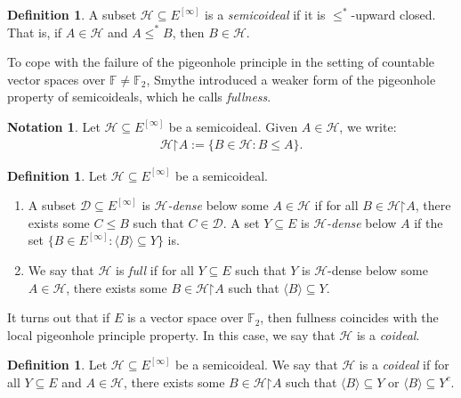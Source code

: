 \documentclass[11pt,reqno]{amsart}
\theoremstyle{plain}
\numberwithin{equation}{section}
\theoremstyle{definition}
\newtheorem{definition}[theorem]{Definition}
\newtheorem{notation}[theorem]{Notation}
\renewcommand{\c}[1]{\langle #1 \rangle}
\newcommand{\cal}{\mathcal}
\newcommand{\restrictedto}{\mathord{\upharpoonright}}
\renewcommand{\H}{\cal{H}}
\newcommand{\D}{\cal{D}}
\begin{document}
\begin{definition}
\label{def:semicoideal}
    A subset $\H \subseteq E^{[\infty]}$ is a \emph{semicoideal} if it is $\leq^*$-upward closed. That is, if $A \in \H$ and $A \leq^* B$, then $B \in \H$.
\end{definition}

To cope with the failure of the pigeonhole principle in the setting of countable vector spaces over $\mathbb{F} \neq \mathbb{F}_2$, Smythe introduced a weaker form of the pigeonhole property of semicoideals, which he calls \emph{fullness}.

\begin{notation}
    Let $\H \subseteq E^{[\infty]}$ be a semicoideal. Given $A \in \H$, we write:
    \begin{align*}
        \H\restrictedto A := \{B \in \H : B \leq A\}.
    \end{align*}
\end{notation}

\begin{definition}
\label{def:full.semicoideal}
    Let $\H \subseteq E^{[\infty]}$ be a semicoideal.
    \begin{enumerate}
        \item A subset $\D \subseteq E^{[\infty]}$ is \emph{$\H$-dense} below some $A \in \H$ if for all $B \in \H\restrictedto A$, there exists some $C \leq B$ such that $C \in \D$. A set $Y \subseteq E$ is \emph{$\H$-dense} below $A$ if the set $\{B \in E^{[\infty]} : \c{B} \subseteq Y\}$ is.

        \item We say that $\H$ is \emph{full} if for all $Y \subseteq E$ such that $Y$ is $\H$-dense below some $A \in \H$, there exists some $B \in \H\restrictedto A$ such that $\c{B} \subseteq Y$.
    \end{enumerate}
\end{definition}

It turns out that if $E$ is a vector space over $\mathbb{F}_2$, then fullness coincides with the local pigeonhole principle property. In this case, we say that $\H$ is a \emph{coideal}.

\begin{definition}
\label{def:coideal.vector.spaces}
    Let $\H \subseteq E^{[\infty]}$ be a semicoideal. We say that $\H$ is a \emph{coideal} if for all $Y \subseteq E$ and $A \in \H$, there exists some $B \in \H\restrictedto A$ such that $\c{B} \subseteq Y$ or $\c{B} \subseteq Y^c$.
\end{definition}
\end{document}
